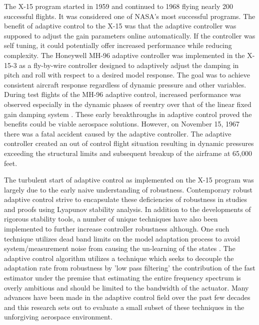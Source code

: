 The X-15 program started in 1959 and continued to 1968 flying nearly 200 successful flights.  It was considered one of NASA's most successful programs.  The benefit of adaptive control to the X-15 was that the adaptive controller was supposed to adjust the gain parameters online automatically.  If the controller was self tuning, it could potentially offer increased performance while reducing complexity.  The Honeywell MH-96 adaptive controller was implemented in the X-15-3 as a fly-by-wire controller designed to adaptively adjust the damping in pitch and roll with respect to a desired model response.  The goal was to achieve consistent aircraft response regardless of dynamic pressure and other variables.  During test flights of the MH-96 adaptive control, increased performance was observed especially in the dynamic phases of reentry over that of the linear fixed gain damping system \cite{dydek2010adaptive}.  These early breakthroughs in adaptive control proved the benefits could be viable aerospace solutions.  However, on November 15, 1967 there was a fatal accident caused by the adaptive controller.  The adaptive controller created an out of control flight situation resulting in dynamic pressures exceeding the structural limits and subsequent breakup of the airframe at 65,000 feet.

The turbulent start of adaptive control as implemented on the X-15 program was largely due to the early naive understanding of robustness.  Contemporary robust adaptive control strive to encapsulate these deficiencies of robustness in studies and proofs using Lyapunov stability analysis.  In addition to the developments of rigorous stability tools, a number of unique techniques have also been implemented to further increase controller robustness although.  One such technique utilizes dead band limits on the model adaptation process to avoid system/measurement noise from causing the un-learning of the states \cite{lavretsky2013robust}.  The \Lone adaptive control algorithm utilizes a technique which seeks to decouple the adaptation rate from robustness by 'low pass filtering' the contribution of the fast estimator under the premise that estimating the entire frequency spectrum is overly ambitious and should be limited to the bandwidth of the actuator.  Many advances have been made in the adaptive control field over the past few decades and this research sets out to evaluate a small subset of these techniques in the unforgiving aerospace environment.





